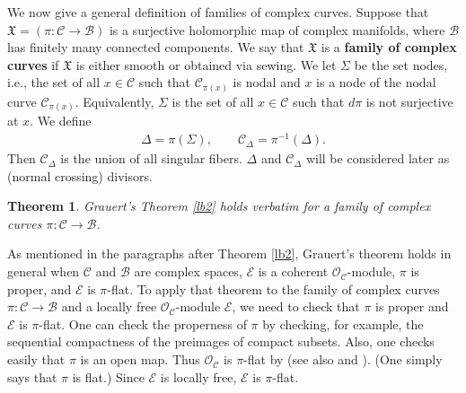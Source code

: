 \documentclass[12pt,a4paper,notitlepage]{report}
\theoremstyle{definition}
\theoremstyle{plain}
\newtheorem{thm}[df]{Theorem}
\newcommand{\fk}{\mathfrak}
\newcommand{\mc}{\mathcal}
\newcommand{\scr}{\mathscr}
\numberwithin{equation}{section}
\begin{document}
We now give a general definition of families of complex curves.   Suppose that $\fk X=(\pi:\mc C\rightarrow \mc B)$ is a surjective holomorphic map of  complex manifolds, where $\mc B$ has finitely many connected components. We say that $\fk X$ is a \textbf{family of complex curves} if  $\fk X$  is  either smooth or obtained via sewing.  
We let $\Sigma$ be the set nodes, i.e., the set of all $x\in\mc C$ such that $\mc C_{\pi(x)}$ is nodal and $x$ is a node of the nodal curve $\mc C_{\pi(x)}$.  Equivalently, $\Sigma$ is the set of all $x\in\mc C$ such that $d\pi$ is not surjective at $x$. We  \index{CDelta@$\mc C_\Delta=\pi^{-1}(\Delta)$}  define
\begin{align*}
\Delta=\pi(\Sigma),\qquad \mc C_\Delta=\pi^{-1}(\Delta).
\end{align*}
Then $\mc C_\Delta$ is the union of all singular fibers. $\Delta$ and $\mc C_\Delta$ will be considered later as (normal crossing) divisors. 

\begin{thm}\label{lb11}
Grauert's Theorem \ref{lb2} holds verbatim for a family of complex curves $\pi:\mc C\rightarrow\mc B$.
\end{thm}


As mentioned in  the paragraphs after Theorem \ref{lb2}, Grauert's theorem holds in general when $\mc C$ and $\mc B$ are complex spaces, $\scr E$ is a coherent $\scr O_{\mc C}$-module, $\pi$ is proper, and $\scr E$ is $\pi$-flat. To apply that theorem to  the family of complex curves $\pi:\mc C\rightarrow\mc B$ and a locally free $\scr O_{\mc C}$-module $\scr E$, we need to check  that $\pi$ is proper and $\scr E$ is $\pi$-flat. One can check the properness of $\pi$ by checking, for example, the sequential compactness of the preimages of  compact subsets. Also, one checks easily that $\pi$ is an open map. Thus $\scr O_{\mc C}$ is $\pi$-flat by  \cite[Sec. 3.20]{Fis76} (see also \cite[Thm. II.2.13]{GPR94} and \cite[Thm. V.2.13]{BS76}). (One simply says that $\pi$ is flat.) Since $\scr E$ is locally free, $\scr E$ is $\pi$-flat.
\end{document}
